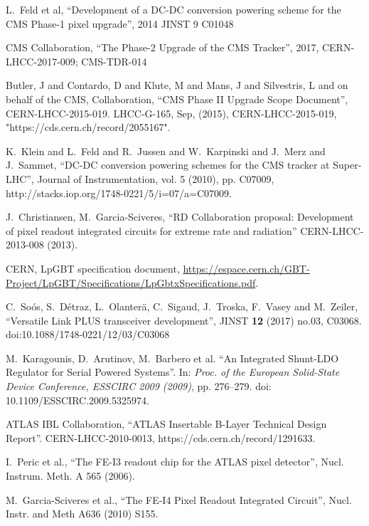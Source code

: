 \begin{thebibliography}{1}
% 
 L.~Feld et al, ``Development of a DC-DC conversion powering scheme for the CMS Phase-1 pixel upgrade'', 2014 JINST 9 C01048

 CMS Collaboration, ``The Phase-2 Upgrade of the CMS
  Tracker'', 2017, CERN-LHCC-2017-009; CMS-TDR-014

 Butler, J and Contardo, D and Klute, M and Mans, J and
                       Silvestris, L and on behalf of the CMS, Collaboration,
      ``CMS Phase II Upgrade Scope Document'',
      CERN-LHCC-2015-019. LHCC-G-165,
      Sep, (2015),
      CERN-LHCC-2015-019, "https://cds.cern.ch/record/2055167".

K.~Klein and L.~Feld and R.~Jussen and W.~Karpinski and J.~Merz and J.~Sammet, ``DC-DC conversion powering schemes for the CMS tracker at Super-LHC'', Journal of Instrumentation, vol. 5 (2010), pp. C07009, http://stacks.iop.org/1748-0221/5/i=07/a=C07009.

 J.~Christiansen, M.~Garcia-Sciveres, ``RD Collaboration proposal: Development of pixel readout integrated circuits for extreme rate and radiation''
CERN-LHCC-2013-008 (2013).

 CERN, LpGBT specification document,
\url{https://espace.cern.ch/GBT-Project/LpGBT/Specifications/LpGbtxSpecifications.pdf}.

 C.~Soós, S.~Détraz, L.~Olanterä, C.~Sigaud, J.~Troska, F.~Vasey and M.~Zeiler, ``Versatile Link PLUS transceiver development'', JINST {\bf 12} (2017) no.03,  C03068. doi:10.1088/1748-0221/12/03/C03068


 M.~Karagounis, D.~Arutinov, M.~Barbero et al. ``An Integrated Shunt-LDO Regulator for Serial Powered Systems''. In: \textit{Proc. of the European Solid-State Device Conference,
ESSCIRC 2009 (2009)}, pp. 276–279. doi: 10.1109/ESSCIRC.2009.5325974.


 ATLAS IBL Collaboration, ``ATLAS Insertable B-Layer
  Technical Design Report''. CERN-LHCC-2010-0013, https://cds.cern.ch/record/1291633.
 


 I.~Peric et al., ``The FE-I3 readout chip for the ATLAS pixel detector'', Nucl. Instrum. Meth. A 565 (2006).

 M.~Garcia-Sciveres et al., ``The FE-I4 Pixel Readout
  Integrated Circuit'', Nucl. Instr. and Meth A636 (2010) S155.


\end{thebibliography}
